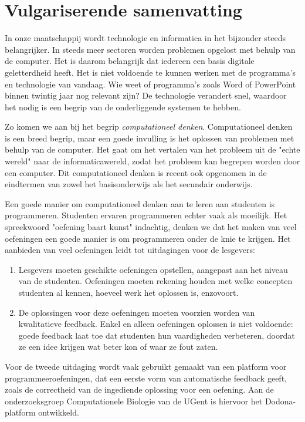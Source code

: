 \chapter*{Vulgariserende samenvatting}

In onze maatschappij wordt technologie en informatica in het bijzonder steeds belangrijker.
In steeds meer sectoren worden problemen opgelost met behulp van de computer.
Het is daarom belangrijk dat iedereen een basis digitale geletterdheid heeft.
Het is niet voldoende te kunnen werken met de programma's en technologie van vandaag.
Wie weet of programma's zoals Word of PowerPoint binnen twintig jaar nog relevant zijn?
De technologie verandert snel, waardoor het nodig is een begrip van de onderliggende systemen te hebben.

Zo komen we aan bij het begrip \emph{computationeel denken}.
Computationeel denken is een breed begrip, maar een goede invulling is het oplossen van problemen met behulp van de computer.
Het gaat om het vertalen van het probleem uit de "echte wereld" naar de informaticawereld, zodat het probleem kan begrepen worden door een computer.
Dit computationeel denken is recent ook opgenomen in de eindtermen van zowel het basisonderwijs als het secundair onderwijs.

Een goede manier om computationeel denken aan te leren aan studenten is programmeren.
Studenten ervaren programmeren echter vaak als moeilijk.
Het spreekwoord "oefening baart kunst" indachtig, denken we dat het maken van veel oefeningen een goede manier is om programmeren onder de knie te krijgen.
Het aanbieden van veel oefeningen leidt tot uitdagingen voor de lesgevers:

\begin{enumerate}
    \item Lesgevers moeten geschikte oefeningen opstellen, aangepast aan het niveau van de studenten.
    Oefeningen moeten rekening houden met welke concepten studenten al kennen, hoeveel werk het oplossen is, enzovoort.
    \item De oplossingen voor deze oefeningen moeten voorzien worden van kwalitatieve feedback.
    Enkel en alleen oefeningen oplossen is niet voldoende: goede feedback laat toe dat studenten hun vaardigheden verbeteren, doordat ze een idee krijgen wat beter kon of waar ze fout zaten.
\end{enumerate}

Voor de tweede uitdaging wordt vaak gebruikt gemaakt van een platform voor programmeeroefeningen, dat een eerste vorm van automatische feedback geeft, zoals de correctheid van de ingediende oplossing voor een oefening.
Aan de onderzoeksgroep Computationele Biologie van de UGent is hiervoor het Dodona-platform ontwikkeld.

